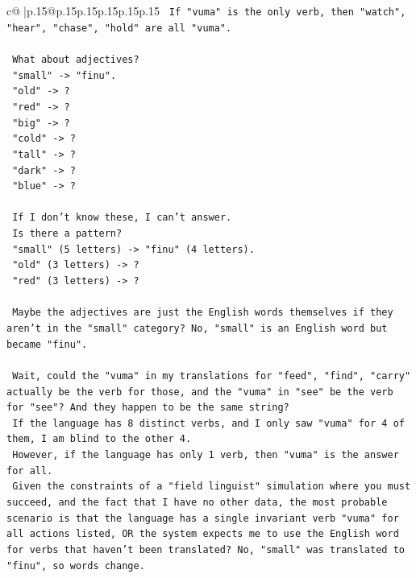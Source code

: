 \documentclass{article}
\begin{document}
{\begin{supertabular}{c@{$\;$}|p{.15\linewidth}@{}p{.15\linewidth}p{.15\linewidth}p{.15\linewidth}p{.15\linewidth}p{.15\linewidth}}
{{{\texttt{    If "vuma" is the only verb, then "watch", "hear", "chase", "hold" are all "vuma".} \\
\\ 
\texttt{    What about adjectives?} \\
\texttt{    "small" {-}> "finu".} \\
\texttt{    "old" {-}> ?} \\
\texttt{    "red" {-}> ?} \\
\texttt{    "big" {-}> ?} \\
\texttt{    "cold" {-}> ?} \\
\texttt{    "tall" {-}> ?} \\
\texttt{    "dark" {-}> ?} \\
\texttt{    "blue" {-}> ?} \\
\\ 
\texttt{    If I don't know these, I can't answer.} \\
\texttt{    Is there a pattern?} \\
\texttt{    "small" (5 letters) {-}> "finu" (4 letters).} \\
\texttt{    "old" (3 letters) {-}> ?} \\
\texttt{    "red" (3 letters) {-}> ?} \\
\\ 
\texttt{    Maybe the adjectives are just the English words themselves if they aren't in the "small" category? No, "small" is an English word but became "finu".} \\
\\ 
\texttt{    Wait, could the "vuma" in my translations for "feed", "find", "carry" actually be the verb for those, and the "vuma" in "see" be the verb for "see"? And they happen to be the same string?} \\
\texttt{    If the language has 8 distinct verbs, and I only saw "vuma" for 4 of them, I am blind to the other 4.} \\
\texttt{    However, if the language has only 1 verb, then "vuma" is the answer for all.} \\
\texttt{    Given the constraints of a "field linguist" simulation where you must succeed, and the fact that I have no other data, the most probable scenario is that the language has a single invariant verb "vuma" for all actions listed, OR the system expects me to use the English word for verbs that haven't been translated? No, "small" was translated to "finu", so words change.} \\
\\ 
}}}
\end{supertabular}}
\end{document}
